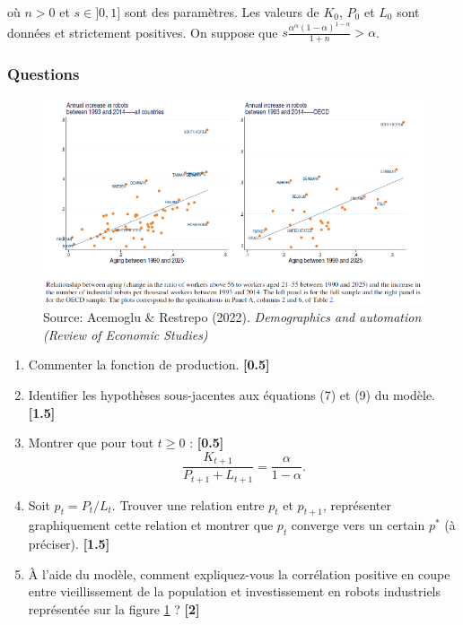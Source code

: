 \documentclass[a4paper,12pt]{article}
\begin{document}
où $n>0$ et $s\in ]0,1]$ sont des paramètres. Les valeurs de $K_0$, $P_0$ et $L_0$ sont données et strictement positives. On suppose que $s\frac{\alpha^\alpha(1-\alpha)^{1-\alpha}}{1+n}>\alpha$.
\subsubsection*{Questions}

\begin{figure}
    \includegraphics[width=\textwidth]{graph1.png}
    \caption{Source: Acemoglu \& Restrepo (2022). \emph{Demographics and automation (Review of Economic Studies)}}
    \label{acemoglu}
\end{figure}

\begin{enumerate}
    \item Commenter la fonction de production. \hfill  \textbf{[0.5]}
    \item Identifier les hypothèses sous-jacentes aux équations (7) et (9) du modèle. \hfill  \textbf{[1.5]}
    \item Montrer que pour tout $t \geq 0$ : \hfill  \textbf{[0.5]}
    \begin{equation}
        \frac{K_{t+1}}{P_{t+1} + L_{t+1}} = \frac{\alpha}{1-\alpha}.
    \end{equation}
    
    \item  Soit $p_t = P_t / L_t$. Trouver une relation entre $p_t$ et $p_{t+1}$,
    représenter graphiquement cette relation et montrer que $p_t$ converge vers un certain $p^*$ (à préciser).  \hfill \textbf{[1.5]}
    \item  À l’aide du modèle, comment expliquez-vous la corrélation positive en coupe entre vieillissement de la population et investissement en robots industriels représentée sur la figure \ref{acemoglu} ? \hfill \textbf{[2]}  
\end{enumerate}
\end{document}
